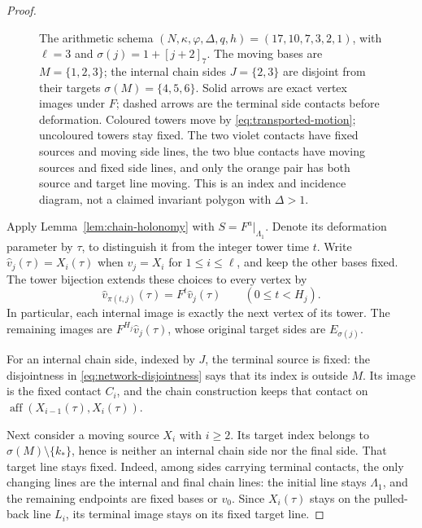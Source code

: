 \documentclass[11pt,a4paper]{article}
\DeclareMathOperator{\aff}{aff}
\theoremstyle{definition}
\theoremstyle{remark}
\numberwithin{equation}{section}
\begin{document}
\begin{proof}
\begin{figure}[htbp]
\caption{The arithmetic schema $(N,\kappa,\varphi,\Delta,q,h)=(17,10,7,3,2,1)$,
with $\ell=3$ and $\sigma(j)=1+[j+2]_7$.
The moving bases are $M=\{1,2,3\}$; the internal chain sides
$J=\{2,3\}$ are disjoint from their targets $\sigma(M)=\{4,5,6\}$.
Solid arrows are exact vertex images under $F$; dashed arrows are the
terminal side contacts before deformation.  Coloured towers move by
\eqref{eq:transported-motion}; uncoloured towers stay fixed.
The two violet contacts have fixed sources and moving side lines,
the two blue contacts have moving sources and fixed side lines,
and only the orange pair has both source and target line moving.
This is an index and incidence diagram, not a claimed invariant polygon
with $\Delta>1$.}
\label{fig:global-motion}
\end{figure}

Apply Lemma~\ref{lem:chain-holonomy} with $S=F^a|_{\Lambda_1}$.
Denote its deformation parameter by $\tau$, to distinguish it from the
integer tower time $t$.  Write $\widehat v_j(\tau)=X_i(\tau)$ when
$v_j=X_i$ for $1\le i\le \ell$, and keep the other bases fixed.
The tower bijection extends these choices to every vertex by
\begin{equation}\label{eq:transported-motion}
 \widehat v_{\pi(t,j)}(\tau)=F^t\widehat v_j(\tau)
 \qquad(0\le t<H_j).
\end{equation}
In particular, each internal image is exactly the next vertex of its
tower.  The remaining images are $F^{H_j}\widehat v_j(\tau)$, whose
original target sides are $E_{\sigma(j)}$.

For an internal chain side, indexed by $J$, the terminal source is
fixed: the disjointness in \eqref{eq:network-disjointness} says that its
index is outside $M$.  Its image is the fixed contact $C_i$, and the
chain construction keeps that contact on
$\aff(X_{i-1}(\tau),X_i(\tau))$.

Next consider a moving source $X_i$ with $i\ge2$.  Its target index
belongs to $\sigma(M)\setminus\{k_*\}$, hence is neither an internal
chain side nor the final side.  That target line stays fixed.  Indeed,
among sides carrying terminal contacts, the only changing lines are
the internal and final chain lines: the initial line stays
$\Lambda_1$, and the remaining endpoints are fixed bases or $v_0$.
Since $X_i(\tau)$ stays on the pulled-back line $L_i$, its terminal
image stays on its fixed target line.


\end{proof}
\end{document}
